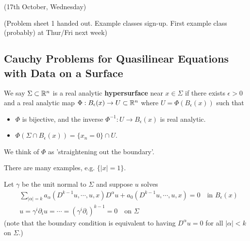 \documentclass[12pt,a4paper]{report}
\begin{document}
\newday

(17th October, Wednesday)
\s

(Problem sheet 1 handed out. Example classes sign-up. First example class (probably) at Thur/Fri next week)
\s

\subsection*{Cauchy Problems for Quasilinear Equations with Data on a Surface}

We say $\Sigma \subset \mathbb{R}^n$ is a real analytic \textbf{hypersurface} near $x\in \Sigma$ if there exists $\epsilon >0$ and a real analytic map $\Phi : B_{\epsilon } (x) \rightarrow U \subset \mathbb{R}^n$ where $U = \Phi(B_{\epsilon}(x))$ such that
\begin{itemize}
\item $\Phi$ is bijective, and the inverse $\Phi^{-1} : U\rightarrow B_{\epsilon}(x)$ is real analytic.
\item $\Phi (\Sigma \cap B_{\epsilon}(x)) = \{x_n=0 \} \cap U$.
\end{itemize}
We think of $\Phi$ as 'straightening out the boundary'. 
\s

There are many examples, e.g. $\{|x|=1\}$.
\s

Let $\gamma$ be the unit normal to $\Sigma$ and suppose $u$ solves
\begin{align}
& \sum_{|\alpha| =k} a_{\alpha}(D^{k-1}u, \cdots, u,x)D^{\alpha} u + a_0(D^{k-1}u, \cdots, u,x) =0 \quad \text{in } B_{\epsilon}(x) \label{dagger}\\
& u= \gamma^i \partial_i u = \cdots =(\gamma^i \partial_i)^{k-1} = 0 \quad \text{on } \Sigma \nonumber
\end{align}
(note that the boundary condition is equivalent to having $D^{\alpha} u =0$ for all $|\alpha| <k$ on $\Sigma$.)
\s
\end{document}
